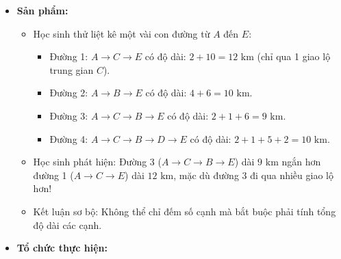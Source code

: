 \documentclass[12pt, a4paper]{article}
\begin{document}
\begin{itemize}[leftmargin=1.2cm]
    \item[c)] \textbf{Sản phẩm:}
    \begin{itemize}[leftmargin=0.6cm]
        \item Học sinh thử liệt kê một vài con đường từ $A$ đến $E$:
        \begin{itemize}
            \item Đường 1: $A \to C \to E$ có độ dài: $2 + 10 = 12\text{ km}$ (chỉ qua 1 giao lộ trung gian $C$).
            \item Đường 2: $A \to B \to E$ có độ dài: $4 + 6 = 10\text{ km}$.
            \item Đường 3: $A \to C \to B \to E$ có độ dài: $2 + 1 + 6 = 9\text{ km}$.
            \item Đường 4: $A \to C \to B \to D \to E$ có độ dài: $2 + 1 + 5 + 2 = 10\text{ km}$.
        \end{itemize}
        \item Học sinh phát hiện: Đường 3 ($A \to C \to B \to E$) dài $9\text{ km}$ ngắn hơn đường 1 ($A \to C \to E$) dài $12\text{ km}$, mặc dù đường 3 đi qua nhiều giao lộ hơn!
        \item Kết luận sơ bộ: Không thể chỉ đếm số cạnh mà bắt buộc phải tính tổng độ dài các cạnh.
    \end{itemize}

    \item[d)] \textbf{Tổ chức thực hiện:}
\end{itemize}
\end{document}
